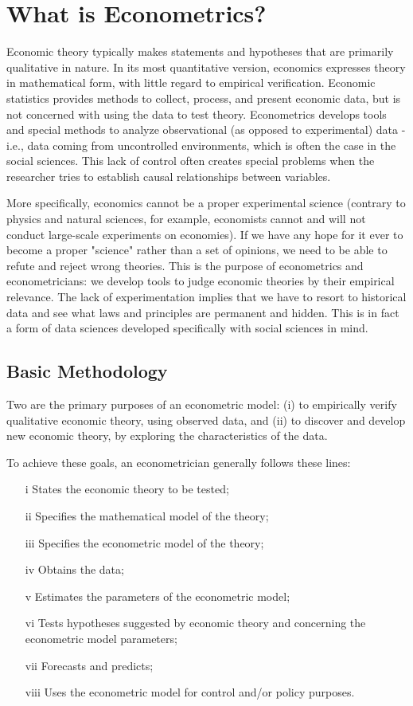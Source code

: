 \section{What is Econometrics?}
Economic theory typically makes statements and hypotheses that are primarily qualitative in nature. In its most quantitative version, economics expresses theory in mathematical form, with little regard to empirical verification. Economic statistics provides methods to collect, process, and present economic data, but is not concerned with using the data to test theory. Econometrics develops tools and special methods to analyze observational (as opposed to experimental) data - i.e., data coming from uncontrolled environments, which is often the case in the social sciences. This lack of control often creates special problems when the researcher tries to establish causal relationships between variables.

More specifically, economics cannot be a proper experimental science (contrary to physics and natural sciences, for example, economists cannot and will not conduct large-scale experiments on economies). If we have any hope for it ever to become a proper "science" rather than a set of opinions, we need to be able to refute and reject wrong theories. This is the purpose of econometrics and econometricians: we develop tools to judge economic theories by their empirical relevance. The lack of experimentation implies that we have to resort to historical data and see what laws and principles are permanent and hidden. This is in fact a form of data sciences developed specifically with social sciences in mind.

\subsection{Basic Methodology}
Two are the primary purposes of an econometric model: (i) to empirically verify qualitative economic theory, using observed data, and (ii) to discover and develop new economic theory, by exploring the characteristics of the data.

To achieve these goals, an econometrician generally follows these lines:\\
\begin{itemize}
    \item [i] States the economic theory to be tested;
    \item [ii] Specifies the mathematical model of the theory;
    \item [iii] Specifies the econometric model of the theory;
    \item [iv] Obtains the data;
    \item [v] Estimates the parameters of the econometric model;
    \item [vi] Tests hypotheses suggested by economic theory and concerning the econometric model parameters;
    \item [vii] Forecasts and predicts;
    \item [viii] Uses the econometric model for control and/or policy purposes.
\end{itemize}

